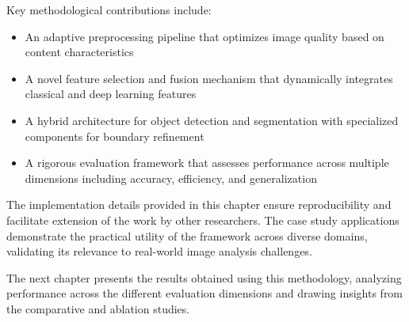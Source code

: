 Key methodological contributions include:
\begin{itemize}
    \item An adaptive preprocessing pipeline that optimizes image quality based on content characteristics
    \item A novel feature selection and fusion mechanism that dynamically integrates classical and deep learning features
    \item A hybrid architecture for object detection and segmentation with specialized components for boundary refinement
    \item A rigorous evaluation framework that assesses performance across multiple dimensions including accuracy, efficiency, and generalization
\end{itemize}

The implementation details provided in this chapter ensure reproducibility and facilitate extension of the work by other researchers. The case study applications demonstrate the practical utility of the framework across diverse domains, validating its relevance to real-world image analysis challenges.

The next chapter presents the results obtained using this methodology, analyzing performance across the different evaluation dimensions and drawing insights from the comparative and ablation studies.
